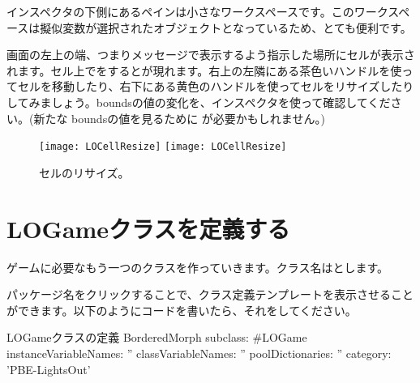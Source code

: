 \documentclass[a4paper,10pt,twoside]{book}
\begin{document}

インスペクタの下側にあるペインは小さなワークスペースです。このワークスペースは擬似変数\self が選択されたオブジェクトとなっているため、とても便利です。


画面の左上の端、つまりメッセージで表示するよう指示した場所にセルが表示されます。セル上で\metaclick をするとが現れます。右上の左隣にある茶色いハンドルを使ってセルを移動したり、右下にある黄色のハンドルを使ってセルをリサイズしたりしてみましょう。boundsの値の変化を、インスペクタを使って確認してください。(新たな boundsの値を見るために  \actclick が必要かもしれません。)

\begin{figure}[htbp]
\centering
\ifluluelse
	{\texttt{[image: LOCellResize]} }
	{\texttt{[image: LOCellResize]} }
\caption{セルのリサイズ。}
\end{figure}


\section{LOGameクラスを定義する}

ゲームに必要なもう一つのクラスを作っていきます。クラス名はとします。


パッケージ名をクリックすることで、クラス定義テンプレートを表示させることができます。以下のようにコードを書いたら、それをしてください。

\begin{classdef}[sbegame]{LOGameクラスの定義}
BorderedMorph subclass: #LOGame
   instanceVariableNames: ''
   classVariableNames: ''
   poolDictionaries: ''
   category: 'PBE-LightsOut'
\end{classdef}
\end{document}
